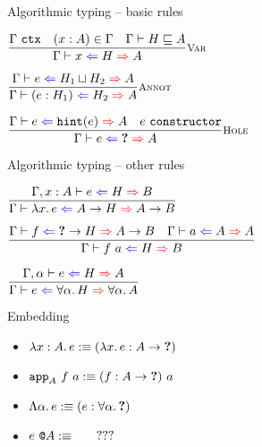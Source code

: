 \documentclass{beamer}
\begin{document}
\begin{frame}{Algorithmic typing -- basic rules}

\begin{center}
  $\infrule[Var]{\tyctx{\Gamma} \quad \sidecond{(x : A) \in \Gamma} \quad \sidecond{\hintorderinctx{H}{A}}}{\hinting{x}{H}{A}}$

  \vspace{2em}

  $\infrule[Annot]{\hinting{e}{\hintlub{H_1}{H_2}}{A}}{\hinting{\annot{e}{H_1}}{H_2}{A}}$

  \vspace{2em}

  $\infrule[Hole]{\hinting{e}{\hintfor{e}}{A} \quad \sidecond{e\ \texttt{constructor}}}{\hinting{e}{\Hole}{A}}$
\end{center}

\end{frame}

\begin{frame}{Algorithmic typing -- other rules}

\begin{center}
  $\infrule{\fullhinting{\extend{\Gamma}{x}{A}}{e}{H}{B}}{\hinting{\fun{x}{e}}{\Fun{A}{H}}{\Fun{A}{B}}}$

  \vspace{2em}

  $\infrule{\hinting{f}{\Fun{\Hole}{H}}{\Fun{A}{B}} \quad \hinting{a}{A}{A}}{\hinting{\app{f}{a}}{H}{B}}$

  \vspace{2em}

  $\infrule{\fullhinting{\extendtype{\Gamma}{\alpha}}{e}{H}{A}}{\hinting{e}{\ForallT{\alpha}{H}}{\ForallT{\alpha}{A}}}$
\end{center}

\end{frame}

\begin{frame}{Embedding}

\begin{itemize}
  \item $\lambda x : A.\, e :\equiv (\lambda x.\, e : A \to \textbf{?})$ \\
  \item $\texttt{app}_{A}\ f\ a :\equiv (f : A \to \textbf{?})\ a$
  \item $\Lambda \alpha.\, e :\equiv (e : \forall \alpha.\, \textbf{?})$
  \item $e\ \texttt{@}A :\equiv \qquad ???$
\end{itemize}

\end{frame}
\end{document}
